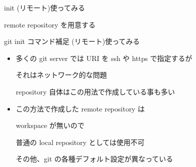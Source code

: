 
\begin{frame}[t]{init (リモート)}{使ってみる}

  remote repository を用意する
  \vspace{4ex}


\end{frame}


\begin{frame}[t]{git init コマンド補足 (リモート)}{使ってみる}

  \begin{itemize}
  \item 多くの git server では URI を ssh や https で指定するが

    それはネットワーク的な問題

    repository 自体はこの用法で作成している事も多い
    \vspace{2ex}

  \item この方法で作成した remote repository は

    workspace が無いので

    普通の local repository としては使用不可

    その他、git の各種デフォルト設定が異なっている
  \end{itemize}

\end{frame}
